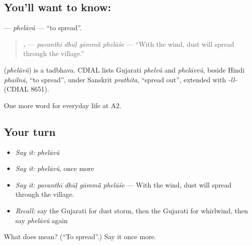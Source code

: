 \subsection*{You'll want to know: }
\textbf{} — \emph{phelāvũ} — \textquotedblleft{}to spread\textquotedblright{}.

\begin{quote}
\textbf{   .} — \emph{pavanthī dhūḷ gāmmā̃ phelāśe} — \textquotedblleft{}With the wind, dust will spread through the village.\textquotedblright{}
\end{quote}

\begin{cousinweb}
\textbf{} (\emph{phelāvũ}) is a tadbhava. CDIAL lists Gujarati \emph{phelvũ} and \emph{phelāvvũ}, beside Hindi \emph{phailnā}, \textquotedblleft{}to spread\textquotedblright{}, under Sanskrit \emph{prathita}, \textquotedblleft{}spread out\textquotedblright{}, extended with \emph{-ll-} (CDIAL 8651).
\end{cousinweb}

\begin{grammarlens}[title={What you've built}]
One more word for everyday life at A2.
\end{grammarlens}

\subsection*{Your turn}
\begin{itemize}
\raggedright
  \item \emph{Say it:} \emph{phelāvũ}
  \item \emph{Say it:} \emph{phelāvũ}, once more
  \item \emph{Say it:} \emph{pavanthī dhūḷ gāmmā̃ phelāśe} — With the wind, dust will spread through the village.
  \item \emph{Recall:} say the Gujarati for dust storm, then the Gujarati for whirlwind, then say \emph{phelāvũ} again
\end{itemize}

\begin{tcolorbox}[breakable,colback=teal!4,colframe=teal!35!black,title={Before you move on}]
What does  mean? (\textquotedblleft{}To spread\textquotedblright{}.) Say it once more.
\end{tcolorbox}
